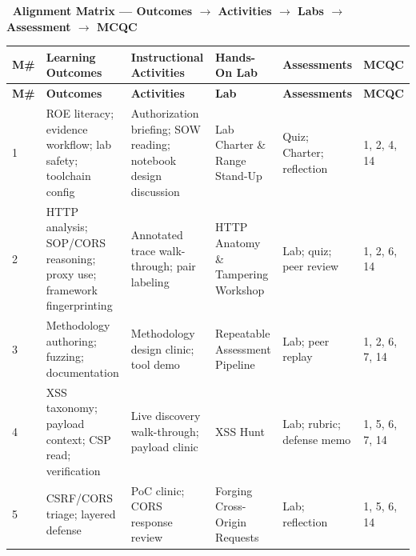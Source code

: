 \documentclass[11pt,letterpaper,oneside]{report}
\renewcommand{\arraystretch}{1.18}
\begin{document}
\begin{landscape}
\thispagestyle{plain}
\setlength\LTleft{0pt}\setlength\LTright{0pt}
\renewcommand{\arraystretch}{1.15}
\footnotesize
\noindent\colorbox{afnavy}{\parbox{\dimexpr\linewidth-2\fboxsep\relax}{\raggedright\color{white}\sffamily\bfseries\large\, Alignment Matrix --- Outcomes $\to$ Activities $\to$ Labs $\to$ Assessment $\to$ MCQC\strut}}\par\nobreak\vspace{2pt}\nobreak
\setlength{\tabcolsep}{6pt}%
\begin{longtable}{@{}R{0.45cm} R{4.40cm} R{4.30cm} R{3.95cm} R{3.95cm} R{3.70cm}@{}}
\toprule
\sffamily\bfseries M\# &
\sffamily\bfseries Learning Outcomes &
\sffamily\bfseries Instructional Activities &
\sffamily\bfseries Hands-On Lab &
\sffamily\bfseries Assessments &
\sffamily\bfseries MCQC \\
\midrule
\endfirsthead
\toprule
\sffamily\bfseries M\# &
\sffamily\bfseries Outcomes &
\sffamily\bfseries Activities &
\sffamily\bfseries Lab &
\sffamily\bfseries Assessments &
\sffamily\bfseries MCQC \\
\midrule
\endhead
\bottomrule
\endfoot

1 & ROE literacy; evidence workflow; lab safety; toolchain config
  & Authorization briefing; SOW reading; notebook design discussion
  & Lab Charter \& Range Stand-Up
  & Quiz; Charter; reflection
  & 1, 2, 4, 14\\

2 & HTTP analysis; SOP/CORS reasoning; proxy use; framework fingerprinting
  & Annotated trace walk-through; pair labeling
  & HTTP Anatomy \& Tampering Workshop
  & Lab; quiz; peer review
  & 1, 2, 6, 14\\

3 & Methodology authoring; fuzzing; documentation
  & Methodology design clinic; tool demo
  & Repeatable Assessment Pipeline
  & Lab; peer replay
  & 1, 2, 6, 7, 14\\

4 & XSS taxonomy; payload context; CSP read; verification
  & Live discovery walk-through; payload clinic
  & XSS Hunt
  & Lab; rubric; defense memo
  & 1, 5, 6, 7, 14\\

5 & CSRF/CORS triage; layered defense
  & PoC clinic; CORS response review
  & Forging Cross-Origin Requests
  & Lab; reflection
  & 1, 5, 6, 14\\


\end{longtable}
\end{landscape}
\end{document}
